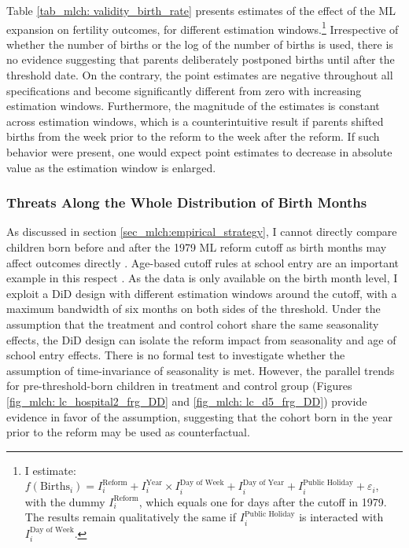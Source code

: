 Table \ref{tab_mlch: validity_birth_rate} presents estimates of the effect of the ML expansion on fertility outcomes, for different estimation windows.\footnote{I estimate: $f(\text{Births}_i) = I^{\text{Reform}}_i + I^{\text{Year}}_i\times I^{\text{Day of Week}}_i + I^{\text{Day of Year}}_i + I^{\text{Public Holiday}}_i + \varepsilon_i$, with the dummy $I^{\text{Reform}}_i$, which equals one for days after the cutoff in 1979. The results remain qualitatively the same if $I^{\text{Public Holiday}}_i$ is interacted with $I^{\text{Day of Week}}_i$.} Irrespective of whether the number of births or the log of the number of births is used, there is no evidence suggesting that parents deliberately postponed births until after the threshold date. On the contrary, the point estimates are negative throughout all specifications and become significantly different from zero with increasing estimation windows. Furthermore, the magnitude of the estimates is constant across estimation windows, which is a counterintuitive result if parents shifted births from the week prior to the reform to the week after the reform. If such behavior were present, one would expect point estimates to decrease in absolute value as the estimation window is enlarged. 





\subsubsection{Threats Along the Whole Distribution of Birth Months}
\label{rev_mlch:threats_birth_months}
As discussed in section \ref{sec_mlch:empirical_strategy}, I cannot directly compare children born before and after the 1979 ML reform cutoff as birth months may affect outcomes directly \citep{buckles2013season,currie2013within}. Age-based cutoff rules at school entry are an important example in this respect \citep{black2011too}. As the data is only available on the birth month level, I exploit a DiD design with different estimation windows around the cutoff, with a maximum bandwidth of six months on both sides of the threshold. Under the assumption that the treatment and control cohort share the same seasonality effects, the DiD design can isolate the reform impact from seasonality and age of school entry effects. There is no formal test to investigate whether the assumption of time-invariance of seasonality is met. However, the parallel trends for pre-threshold-born children in treatment and control group (Figures \ref{fig_mlch: lc_hospital2_frg_DD} and \ref{fig_mlch: lc_d5_frg_DD}) provide evidence in favor of the assumption, suggesting that the cohort born in the year prior to the reform may be used as counterfactual.

